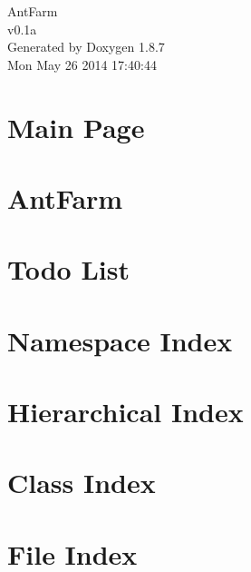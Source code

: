 \documentclass[twoside]{book}
\newcommand{\+}{\discretionary{\mbox{\scriptsize$\hookleftarrow$}}{}{}}
\newcommand{\clearemptydoublepage}{%
  \newpage{\pagestyle{empty}\cleardoublepage}%
}
\begin{document}
\hypersetup{pageanchor=false,
             bookmarks=true,
             bookmarksnumbered=true,
             pdfencoding=unicode
            }
\begin{titlepage}
\vspace*{7cm}
\begin{center}%
{\Large Ant\+Farm \\[1ex]\large v0.\+1a }\\
\vspace*{1cm}
{\large Generated by Doxygen 1.8.7}\\
\vspace*{0.5cm}
{\small Mon May 26 2014 17:40:44}\\
\end{center}
\end{titlepage}
\clearemptydoublepage
\tableofcontents
\clearemptydoublepage
{}
\hypersetup{pageanchor=true}

\chapter{Main Page}
\label{index}\hypertarget{index}{}
\chapter{Ant\+Farm}
\label{df/dc9/md__g_1__ant_farm__r_e_a_d_m_e}
\hypertarget{df/dc9/md__g_1__ant_farm__r_e_a_d_m_e}{}

\chapter{Todo List}
\label{dd/da0/todo}
\hypertarget{dd/da0/todo}{}

\chapter{Namespace Index}

\chapter{Hierarchical Index}

\chapter{Class Index}

\chapter{File Index}

\end{document}
